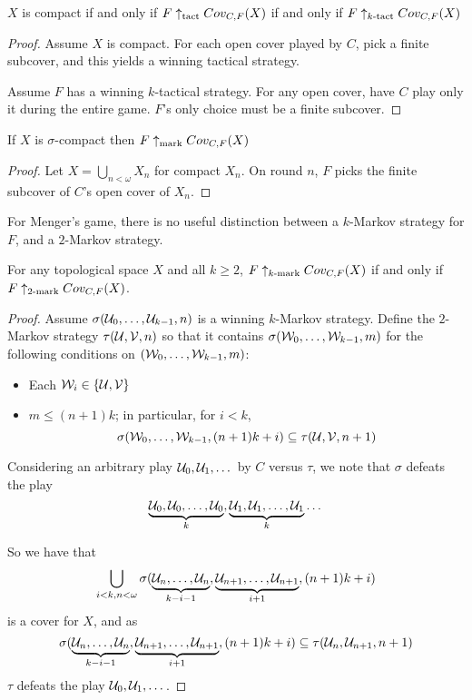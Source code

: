   \begin{proposition}
    $X$ is compact if and only if $F \uparrow_{\text{tact}} Cov_{C,F}(X)$ if and only if $F \uparrow_{k\text{-tact}} Cov_{C,F}(X)$
  \end{proposition}

  \begin{proof}
    Assume $X$ is compact. For each open cover played by $C$, pick a finite subcover, and this yields a winning tactical strategy.

    Assume $F$ has a winning $k$-tactical strategy. For any open cover, have $C$ play only it during the entire game. $F$'s only choice must be a finite subcover.
  \end{proof}

  \begin{proposition}
    If $X$ is $\sigma$-compact then $F \uparrow_{\text{mark}} Cov_{C,F}(X)$
  \end{proposition}

  \begin{proof}
    Let $X=\bigcup_{n<\omega} X_n$ for compact $X_n$. On round $n$, $F$ picks the finite subcover of $C$'s open cover of $X_n$.
  \end{proof}

  For Menger's game, there is no useful distinction between a $k$-Markov strategy for $F$, and a $2$-Markov strategy.

  \begin{theorem}
  For any topological space $X$ and all $k \geq 2$, $F \uparrow_{k\text{-mark}} Cov_{C,F}(X)$ if and only if $F \uparrow_{2\text{-mark}} Cov_{C,F}(X)$.
  \end{theorem}

  \begin{proof}
  Assume $\sigma(\mathcal{U}_0,\dots,\mathcal{U}_{k-1},n)$ is a winning $k$-Markov strategy. Define the $2$-Markov strategy $\tau(\mathcal{U},\mathcal{V},n)$ so that it contains $\sigma(\mathcal{W}_0,\dots,\mathcal{W}_{k-1},m)$ for the following conditions on $(\mathcal{W}_0,\dots,\mathcal{W}_{k-1},m)$:
    \begin{itemize}
    \item Each $\mathcal{W}_i \in \{\mathcal{U},\mathcal{V}\}$
    \item $m \leq (n+1)k$; in particular, for $i<k$, 
      \[
        \sigma(\mathcal{W}_0,\dots,\mathcal{W}_{k-1},(n+1)k+i)
        \subseteq 
        \tau(\mathcal{U},\mathcal{V},n+1) 
      \]
    \end{itemize}

  Considering an arbitrary play $\mathcal{U}_0, \mathcal{U}_1, \dots$ by $C$ versus $\tau$, we note that $\sigma$ defeats the play 
  \[
    \underbrace{\mathcal{U}_0,\mathcal{U}_0,\dots,\mathcal{U}_0}_{k},
    \underbrace{\mathcal{U}_1,\mathcal{U}_1,\dots,\mathcal{U}_1}_{k}
    \dots
  \]

  So we have that
    \[
      \bigcup_{i<k, n<\omega} \sigma(
      \underbrace{\mathcal{U}_n,\dots,\mathcal{U}_n}_{k-i-1},
      \underbrace{\mathcal{U}_{n+1},\dots,\mathcal{U}_{n+1}}_{i+1},
      (n+1)k+i)
    \]
  is a cover for $X$, and as 
    \[
      \sigma(
      \underbrace{\mathcal{U}_n,\dots,\mathcal{U}_n}_{k-i-1},
      \underbrace{\mathcal{U}_{n+1},\dots,\mathcal{U}_{n+1}}_{i+1},
      (n+1)k+i)
      \subseteq 
      \tau(\mathcal{U}_n,\mathcal{U}_{n+1},n+1)
    \]
  $\tau$ defeats the play $\mathcal{U}_0, \mathcal{U}_1, \dots$.
  \end{proof}

